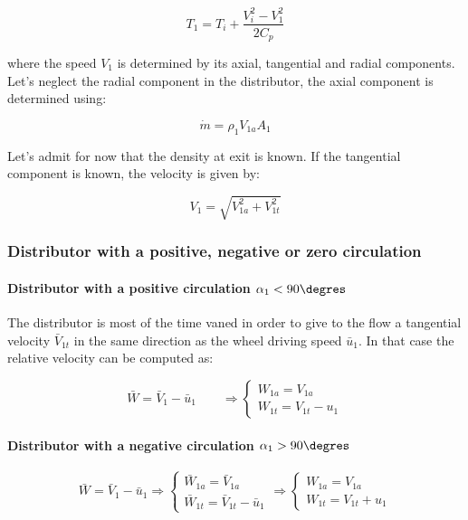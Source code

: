 \begin{equation}
T_1 = T_i + \frac{V_i^2-V_1^2}{2C_p}
\end{equation}

where the speed $V_1$ is determined by its axial, tangential and radial components. Let's neglect the radial component in the distributor, the axial component is determined using: 

\begin{equation}
\dot{m} = \rho _1 V_{1a} A_1
\end{equation}

Let's admit for now that the density at exit is known. If the tangential component is known, the velocity is given by:

\begin{equation}
V_1 = \sqrt{V_{1a}^2+V_{1t}^2}
\end{equation}

\subsubsection{Distributor with a positive, negative or zero circulation}
\paragraph{Distributor with a positive circulation $\alpha _1 < 90\degres$}
The distributor is most of the time vaned in order to give to the flow a tangential velocity $\bar{V}_{1t}$ in the same direction as the wheel driving speed $\bar{u}_1$. In that case the relative velocity can be computed as:

\begin{equation}
\bar{W} = \bar{V}_1-\bar{u}_1 \qquad \Rightarrow \left\{ \begin{array}{c}
W_{1a} = V_{1a}\\
W_{1t} = V_{1t}- u_1
\end{array} \right.
\end{equation}


\paragraph{Distributor with a negative circulation $\alpha _1 > 90\degres$}
\begin{equation*}
\bar{W} = \bar{V}_1-\bar{u}_1 \Rightarrow \left\{ \begin{array}{c}
\bar{W}_{1a} = \bar{V}_{1a}\\
\bar{W}_{1t} = \bar{V}_{1t} - \bar{u}_1
\end{array} \right.
\Rightarrow
\left\{ \begin{array}{c}
W_{1a} = V_{1a}\\
W_{1t} = V_{1t} + u_1
\end{array} \right.
\end{equation*}

